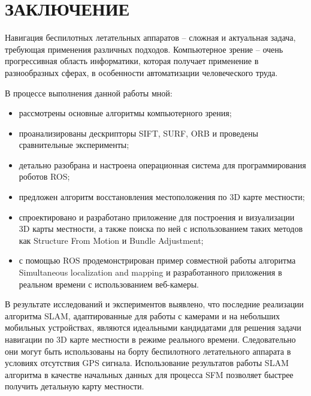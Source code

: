 \chapter*{ЗАКЛЮЧЕНИЕ}

Навигация беспилотных летательных аппаратов -- сложная и актуальная задача, требующая применения различных подходов. Компьютерное зрение -- очень прогрессивная область информатики, которая получает применение в разнообразных сферах, в особенности автоматизации человеческого труда.

В процессе выполнения данной работы мной:

\begin{itemize}
    \item рассмотрены основные алгоритмы компьютерного зрения;
    \item проанализированы дескрипторы SIFT, SURF, ORB и проведены сравнительные эксперименты;
    \item детально разобрана и настроена операционная система для программирования роботов ROS;
    \item предложен алгоритм восстановления местоположения по 3D карте местности;
    \item спроектировано и разработано приложение для построения и визуализации 3D карты местности, а также поиска по ней с использованием таких методов как Structure From Motion и Bundle Adjustment;
    \item с помощью ROS продемонстрирован пример совместной работы алгоритма Simultaneous localization and mapping и разработанного приложения в реальном времени с использованием веб-камеры.
\end{itemize}

В результате исследований и экспериментов выявлено, что последние реализации алгоритма SLAM, адаптированные для работы с камерами и на небольших мобильных устройствах, являются идеальными кандидатами для решения задачи навигации по 3D карте местности в режиме реального времени. Следовательно они могут быть использованы на борту беспилотного летательного аппарата в условиях отсутствия GPS сигнала. Использование результатов работы SLAM алгоритма в качестве начальных данных для процесса SFM позволяет быстрее получить детальную карту местности.

\newpage
